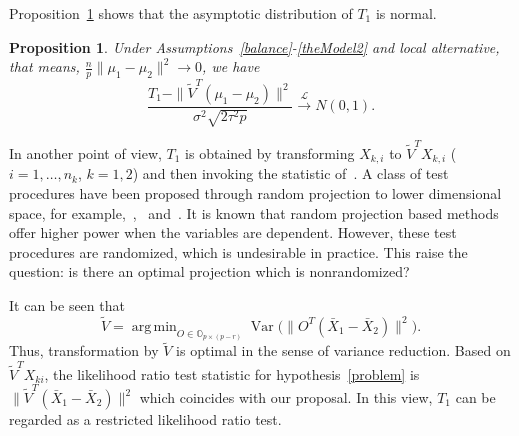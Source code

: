 \documentclass[review]{elsarticle}
\DeclareMathOperator{\myVar}{Var}
\theoremstyle{plain}
\newtheorem{proposition}{\quad\quad Proposition}
\theoremstyle{definition}
\theoremstyle{remark}
\begin{document}

Proposition~\ref{oracleTheorem} shows that the asymptotic distribution of $T_1$ is normal.
\begin{proposition}\label{oracleTheorem}
    Under Assumptions~\ref{balance}-\ref{theModel2} and local alternative, that means, $\frac{n}{p}\|\mu_1-\mu_2\|^2\to 0$, we have 
    \begin{equation*}
        \frac{T_1-\|\tilde{V}^T(\mu_1-\mu_2)\|^2}
        {\sigma^2\sqrt{2\tau^2 p}}\xrightarrow{\mathcal{L}}N(0,1).
    \end{equation*}
\end{proposition}



In another point of view,
$T_1$ is obtained by transforming $X_{k,i}$ to $\tilde{V}^T X_{k,i}$ ($i=1,\ldots, n_k$, $k=1,2$) and then invoking the statistic of~\cite{Chen2010A}.
A class of test procedures have been proposed through random projection to lower dimensional space, for example,~\cite{Lopes2015A},~\cite{Thulin2014A} and~\cite{Srivastava2014RAPTT}.
It is known that random projection based methods offer higher power when the variables are dependent.
However, these test procedures are randomized, which is undesirable in practice.
This raise the question: is there an optimal projection which is nonrandomized?

It can be seen that
$$
\tilde{V}=\mathop{\operatorname{arg\,min}}_{O\in\mathbb{O}_{p\times(p-r)}}\myVar\big(\|O^T(\bar{X}_1-\bar{X}_2)\|^2\big).
$$
Thus, transformation by $\tilde{V}$ is optimal in the sense of variance reduction.
 Based on $\tilde{V}^T X_{ki}$, the likelihood ratio test statistic for hypothesis~\eqref{problem} is
    $\|\tilde{V}^T (\bar{X}_1-\bar{X}_2)\|^2$ which coincides with our proposal.
    In this view, $T_1$ can be regarded as a restricted likelihood ratio test.
\end{document}
